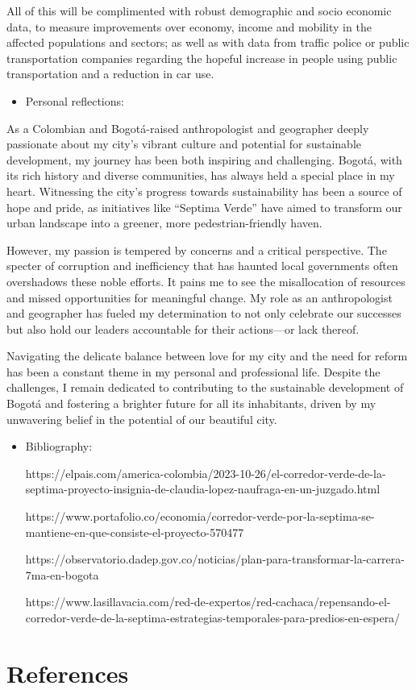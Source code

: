 \documentclass[
  letterpaper,
  DIV=11,
  numbers=noendperiod]{scrreprt}
\providecommand{\tightlist}{%
  \setlength{\itemsep}{0pt}\setlength{\parskip}{0pt}}\usepackage{longtable,booktabs,array}
\newlength{\cslhangindent}
\newlength{\cslentryspacingunit} %
\newenvironment{CSLReferences}[2] %
 {%
  \setlength{\parindent}{0pt}
  \ifodd #1
  \let\oldpar\par
  \def\par{\hangindent=\cslhangindent\oldpar}
  \fi
  \setlength{\parskip}{#2\cslentryspacingunit}
 }%
 {}
\begin{document}
All of this will be complimented with robust demographic and socio
economic data, to measure improvements over economy, income and mobility
in the affected populations and sectors; as well as with data from
traffic police or public transportation companies regarding the hopeful
increase in people using public transportation and a reduction in car
use.

\begin{itemize}
\tightlist
\item
  Personal reflections:
\end{itemize}

As a Colombian and Bogotá-raised anthropologist and geographer deeply
passionate about my city's vibrant culture and potential for sustainable
development, my journey has been both inspiring and challenging. Bogotá,
with its rich history and diverse communities, has always held a special
place in my heart. Witnessing the city's progress towards sustainability
has been a source of hope and pride, as initiatives like ``Septima
Verde'' have aimed to transform our urban landscape into a greener, more
pedestrian-friendly haven.

However, my passion is tempered by concerns and a critical perspective.
The specter of corruption and inefficiency that has haunted local
governments often overshadows these noble efforts. It pains me to see
the misallocation of resources and missed opportunities for meaningful
change. My role as an anthropologist and geographer has fueled my
determination to not only celebrate our successes but also hold our
leaders accountable for their actions---or lack thereof.

Navigating the delicate balance between love for my city and the need
for reform has been a constant theme in my personal and professional
life. Despite the challenges, I remain dedicated to contributing to the
sustainable development of Bogotá and fostering a brighter future for
all its inhabitants, driven by my unwavering belief in the potential of
our beautiful city.

\begin{itemize}
\item
  Bibliography:

  https://elpais.com/america-colombia/2023-10-26/el-corredor-verde-de-la-septima-proyecto-insignia-de-claudia-lopez-naufraga-en-un-juzgado.html

  https://www.portafolio.co/economia/corredor-verde-por-la-septima-se-mantiene-en-que-consiste-el-proyecto-570477

  https://observatorio.dadep.gov.co/noticias/plan-para-transformar-la-carrera-7ma-en-bogota

  https://www.lasillavacia.com/red-de-expertos/red-cachaca/repensando-el-corredor-verde-de-la-septima-estrategias-temporales-para-predios-en-espera/
\end{itemize}


\hypertarget{references}{%
\chapter*{References}\label{references}}


\hypertarget{refs}{}
\begin{CSLReferences}{0}{0}
\end{CSLReferences}
\end{document}
